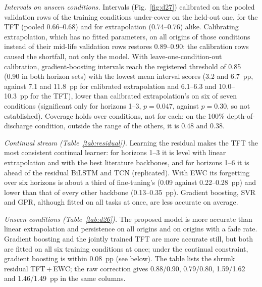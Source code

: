 \documentclass[conference]{IEEEtran}
\begin{document}
\emph{Intervals on unseen conditions.} Intervals (Fig.~\ref{fig:d27}) calibrated on the pooled validation rows of the training conditions under-cover on the held-out one, for the TFT (pooled 0.66--0.68) and for extrapolation (0.74--0.76) alike. Calibrating extrapolation, which has no fitted parameters, on all origins of those conditions instead of their mid-life validation rows restores 0.89--0.90: the calibration rows caused the shortfall, not only the model. With leave-one-condition-out calibration, gradient-boosting intervals reach the registered threshold of 0.85 (0.90 in both horizon sets) with the lowest mean interval scores (3.2 and 6.7~pp, against 7.1 and 11.8~pp for calibrated extrapolation and 6.1--6.3 and 10.0--10.3~pp for the TFT), lower than calibrated extrapolation's on six of seven conditions (significant only for horizons 1--3, $p=0.047$, against $p=0.30$, so not established). Coverage holds over conditions, not for each: on the 100\% depth-of-discharge condition, outside the range of the others, it is 0.48 and 0.38.

\emph{Continual stream (Table~\ref{tab:residual}).} Learning the residual makes the TFT the most consistent continual learner: for horizons 1--3 it is level with linear extrapolation and with the best literature backbones, and for horizons 1--6 it is ahead of the residual BiLSTM and TCN (replicated). With EWC its forgetting over six horizons is about a third of fine-tuning's (0.09 against 0.22--0.28~pp) and lower than that of every other backbone (0.13--0.35~pp). Gradient boosting, SVR and GPR, although fitted on all tasks at once, are less accurate on average.

\emph{Unseen conditions (Table~\ref{tab:d26}).} The proposed model is more accurate than linear extrapolation and persistence on all origins and on origins with a fade rate. Gradient boosting and the jointly trained TFT are more accurate still, but both are fitted on all six training conditions at once; under the continual constraint, gradient boosting is within 0.08~pp (see below). The table lists the shrunk residual TFT\,+\,EWC; the raw correction gives 0.88/0.90, 0.79/0.80, 1.59/1.62 and 1.46/1.49~pp in the same columns.
\end{document}
